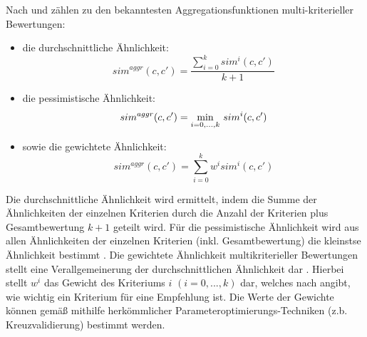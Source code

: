 Nach \textcite[S. 427]{recommenderSystems:2016} und \textcite[S. 857]{adomavicius:4:inbook} zählen zu den bekanntesten Aggregationsfunktionen multi-kriterieller Bewertungen:
\begin{itemize}
    \item die durchschnittliche Ähnlichkeit:
    \begin{equation}\label{eq15}
        sim^{aggr}(c,c') = \frac{\sum\limits_{i=0}^{k}sim^{i}(c,c')}{k+1}
    \end{equation}
    \item die pessimistische Ähnlichkeit:
    \begin{equation}\label{eq16}
        sim^{aggr}(c,c') = \underset{i=0,...,k}{\min}\textnormal{ }sim^{i}(c,c')
    \end{equation}
    \item sowie die gewichtete Ähnlichkeit:
    \begin{equation}\label{eq17}
        sim^{aggr}(c,c') = \sum\limits_{i=0}^{k}w^{i}sim^{i}(c,c')
    \end{equation}
\end{itemize}

Die durchschnittliche Ähnlichkeit wird ermittelt, indem die Summe der Ähnlichkeiten der einzelnen Kriterien durch die Anzahl der Kriterien plus Gesamtbewertung $k+1$ geteilt wird.
Für die pessimistische Ähnlichkeit wird aus allen Ähnlichkeiten der einzelnen Kriterien (inkl. Gesamtbewertung) die kleinstse Ähnlichkeit bestimmt \cite[S. 427]{recommenderSystems:2016}.
Die gewichtete Ähnlichkeit multikriterieller Bewertungen \cite[Kapitel 6.1 The Algorithm, Abs. 1ff.]{tang:article} stellt eine Verallgemeinerung der durchschnittlichen Ähnlichkeit dar \cite[S. 427]{recommenderSystems:2016}.
Hierbei stellt $w^{i}$ das Gewicht des Kriteriums $i$ $(i=0,...,k)$ dar, welches nach \textcite[S. 857]{adomavicius:4:inbook} angibt, wie wichtig ein Kriterium für eine Empfehlung ist.
Die Werte der Gewichte können gemäß \textcite[S. 428]{recommenderSystems:2016} mithilfe herkömmlicher Parameteroptimierungs-Techniken (z.b. Kreuzvalidierung) bestimmt werden.

